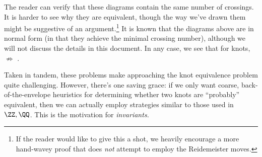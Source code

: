 The reader can verify that these diagrams contain the same number of
crossings. It is harder to see why they are equivalent, though the way
we've drawn them might be suggestive of an argument.\footnote{If the
  reader would like to give this a shot, we heavily encourage a more
  hand-wavey proof that does \emph{not} attempt to employ the
  Reidemeister moves.} It is known that the diagrams above are in
normal form (in that they achieve the minimal crossing number),
although we will not discuss the details in this document.
In any case, we see that for knots, 
$\nRightarrow$ .

Taken in tandem, these problems make approaching the knot equivalence
problem quite challenging. However, there's one saving grace: if we
only want coarse, back-of-the-envelope heuristics for determining
whether two knots are ``probably'' equivalent, then we can actually
employ strategies similar to those used in $\ZZ, \QQ$. This is the
motivation for \emph{invariants.}

